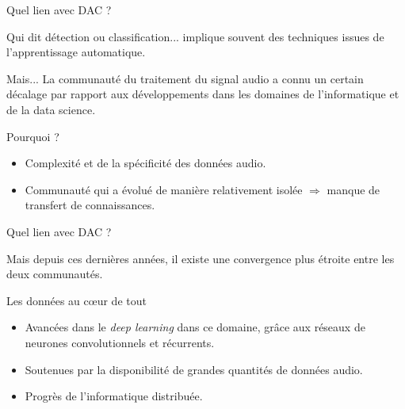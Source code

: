 \documentclass[compress,xcolor=table]{beamer}
\begin{document}
\begin{frame}{Quel lien avec DAC ?}

    Qui dit détection ou classification... implique souvent des techniques issues de l'apprentissage automatique.

    \begin{alertblock}{Mais...}
        La communauté du traitement du signal audio a connu un certain décalage par rapport aux développements dans les domaines de l'informatique et de la data science.
    \end{alertblock}

    \begin{block}{Pourquoi ?}
        \begin{itemize}
            \item Complexité et de la spécificité des données audio.
            \item Communauté qui a évolué de manière relativement isolée $\Rightarrow$ manque de transfert de connaissances.
        \end{itemize}

    \end{block}

\end{frame}

\begin{frame}{Quel lien avec DAC ?}

    Mais depuis ces dernières années, il existe une convergence plus étroite entre les deux communautés.

    \begin{exampleblock}{Les données au c\oe ur de tout}
        \begin{itemize}
            \item Avancées dans le \textit{deep learning} dans ce domaine, grâce aux réseaux de neurones convolutionnels et récurrents.
            \item Soutenues par la disponibilité de grandes quantités de données audio.
            \item Progrès de l'informatique distribuée.
        \end{itemize}
    \end{exampleblock}

\end{frame}
\end{document}
